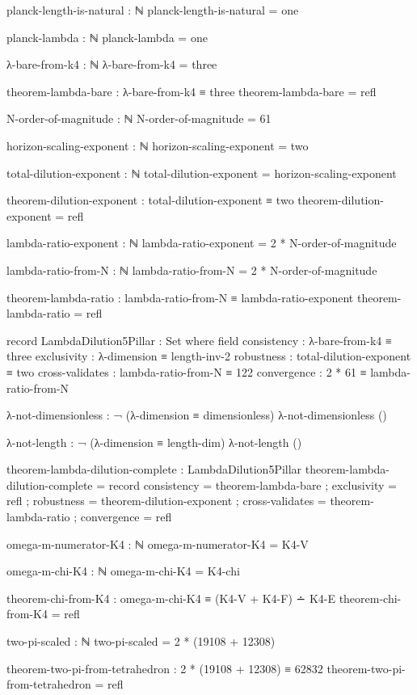 \documentclass[11pt,a4paper]{book}
\begin{document}
\begin{code}
  planck-length-is-natural : ℕ
  planck-length-is-natural = one
  
  planck-lambda : ℕ
  planck-lambda = one
  
  λ-bare-from-k4 : ℕ
  λ-bare-from-k4 = three
  
  theorem-lambda-bare : λ-bare-from-k4 ≡ three
  theorem-lambda-bare = refl

  N-order-of-magnitude : ℕ
  N-order-of-magnitude = 61

  horizon-scaling-exponent : ℕ
  horizon-scaling-exponent = two
  
  total-dilution-exponent : ℕ
  total-dilution-exponent = horizon-scaling-exponent
  
  theorem-dilution-exponent : total-dilution-exponent ≡ two
  theorem-dilution-exponent = refl

  lambda-ratio-exponent : ℕ
  lambda-ratio-exponent = 2 * N-order-of-magnitude
  
  lambda-ratio-from-N : ℕ
  lambda-ratio-from-N = 2 * N-order-of-magnitude
  
  theorem-lambda-ratio : lambda-ratio-from-N ≡ lambda-ratio-exponent
  theorem-lambda-ratio = refl
  
  record LambdaDilution5Pillar : Set where
    field
      consistency     : λ-bare-from-k4 ≡ three
      exclusivity     : λ-dimension ≡ length-inv-2
      robustness      : total-dilution-exponent ≡ two
      cross-validates : lambda-ratio-from-N ≡ 122
      convergence     : 2 * 61 ≡ lambda-ratio-from-N
  
  λ-not-dimensionless : ¬ (λ-dimension ≡ dimensionless)
  λ-not-dimensionless ()
  
  λ-not-length : ¬ (λ-dimension ≡ length-dim)
  λ-not-length ()
      
  theorem-lambda-dilution-complete : LambdaDilution5Pillar
  theorem-lambda-dilution-complete = record
    { consistency     = theorem-lambda-bare
    ; exclusivity     = refl
    ; robustness      = theorem-dilution-exponent
    ; cross-validates = theorem-lambda-ratio
    ; convergence     = refl
    }

omega-m-numerator-K4 : ℕ
omega-m-numerator-K4 = K4-V

omega-m-chi-K4 : ℕ
omega-m-chi-K4 = K4-chi

theorem-chi-from-K4 : omega-m-chi-K4 ≡ (K4-V + K4-F) ∸ K4-E
theorem-chi-from-K4 = refl

two-pi-scaled : ℕ
two-pi-scaled = 2 * (19108 + 12308)
  
theorem-two-pi-from-tetrahedron : 2 * (19108 + 12308) ≡ 62832
theorem-two-pi-from-tetrahedron = refl


\end{code}
\end{document}
